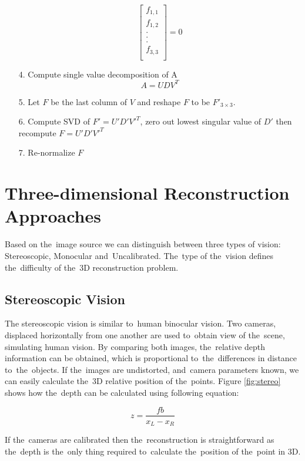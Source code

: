 \begin{itemize}
\begin{equation}
		\begin{bmatrix}
			f_{1,1} \\
			f_{1,2} \\
			. \\
			. \\
			. \\
			f_{3,3} \\
		\end{bmatrix}
		= 0
	\end{equation}
	\item[4.] Compute single value decomposition of A
		\begin{equation}
			A = UDV^T
		\end{equation}
	\item[5.] Let $F$ be the last column of $V$ and reshape $F$ to be  $F'_{3 \times 3}$.
	\item[6.] Compute SVD of $F'=U'D'V'^T$, zero out lowest singular value of $D'$ then recompute $F = U'D'V'^T$
	\item[7.] Re-normalize $F$
\end{itemize}

\section{Three-dimensional Reconstruction Approaches}
Based on the~image source we can distinguish between three types of vision: Stereoscopic, Monocular and~Uncalibrated. The~type of the~vision defines the~difficulty of the~3D reconstruction problem. \cite{book:multiple_view_geometry}

\subsection*{Stereoscopic Vision}
The stereoscopic vision is similar to~human binocular vision. Two cameras, displaced horizontally from one another are used to~obtain view of the~scene, simulating human vision. By comparing both images, the~relative depth information can be obtained, which is proportional to~the~differences in distance to~the~objects. If the~images are undistorted, and~camera parameters known, we can easily calculate the~3D relative position of the~points. Figure \ref{fig:stereo} shows how the~depth can be calculated using following equation:

\begin{equation}
	z=\frac{f b}{x_L - x_R}
\end{equation}

If the~cameras are calibrated then the~reconstruction is straightforward as the~depth is the~only thing required to~calculate the~position of the~point in 3D.

